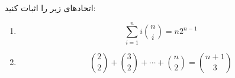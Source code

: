 \EXERCISE
اتحادها‌ی زیر را اثبات کنید:
\begin{enumerate}
\item
$$\sum_{i=1}^{n} i \binom{n}{i} = n 2^{n-1}$$
\item
$$\binom{2}{2} + \binom 3 2 + \cdots + \binom n 2 = \binom{n+1}{3}$$
\end{enumerate}